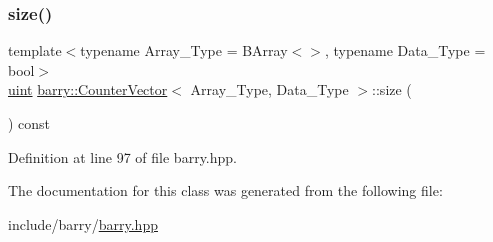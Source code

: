 \mbox{\label{classbarry_1_1_counter_vector_a05508f97e15d5a6dd2fdefb2d03060de}} 
\subsubsection{\texorpdfstring{size()}{size()}}
{\footnotesize\ttfamily template$<$typename Array\+\_\+\+Type = B\+Array$<$$>$, typename Data\+\_\+\+Type = bool$>$ \\
\hyperlink{namespacebarry_a11dfc53ddb4672278319aa04f1e09a6c}{uint} \hyperlink{classbarry_1_1_counter_vector}{barry\+::\+Counter\+Vector}$<$ Array\+\_\+\+Type, Data\+\_\+\+Type $>$\+::size (\begin{DoxyParamCaption}{ }\end{DoxyParamCaption}) const\hspace{0.3cm}{\ttfamily [inline]}}



Definition at line 97 of file barry.\+hpp.



The documentation for this class was generated from the following file\+:\begin{DoxyCompactItemize}
\item 
include/barry/\hyperlink{barry_8hpp}{barry.\+hpp}\end{DoxyCompactItemize}
